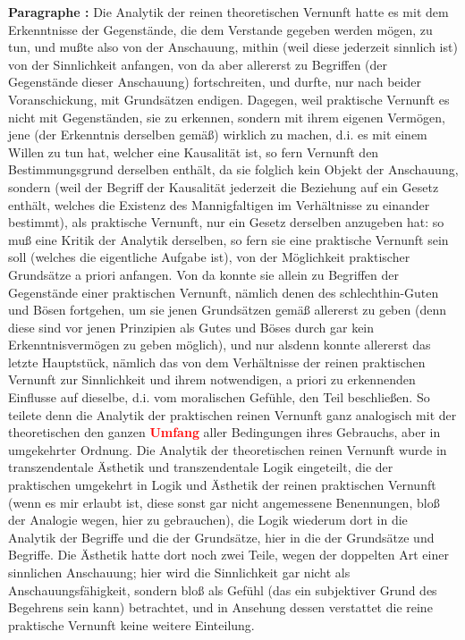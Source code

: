 \documentclass[a4paper,12pt,twoside]{book}
\newcommand{\match}[1]{\textcolor{red}{\textbf{#1}}}
\begin{document}
	\textbf{Paragraphe : }Die Analytik der reinen theoretischen Vernunft hatte es mit dem Erkenntnisse der Gegenstände, die dem Verstande gegeben werden mögen, zu tun, und mußte also von der Anschauung, mithin (weil diese jederzeit sinnlich ist) von der Sinnlichkeit anfangen, von da aber allererst zu Begriffen (der Gegenstände dieser Anschauung) fortschreiten, und durfte, nur nach beider Voranschickung, mit Grundsätzen endigen. Dagegen, weil praktische Vernunft es nicht mit Gegenständen, sie zu erkennen, sondern mit ihrem eigenen Vermögen, jene (der Erkenntnis derselben gemäß) wirklich zu machen, d.i. es mit einem Willen zu tun hat, welcher eine Kausalität ist, so fern Vernunft den Bestimmungsgrund derselben enthält, da sie folglich kein Objekt der Anschauung, sondern (weil der Begriff der Kausalität jederzeit die Beziehung auf ein Gesetz enthält, welches die Existenz des Mannigfaltigen im Verhältnisse zu einander bestimmt), als praktische Vernunft, nur ein Gesetz derselben anzugeben hat: so muß eine Kritik der Analytik derselben, so fern sie eine praktische Vernunft sein soll (welches die eigentliche Aufgabe ist), von der Möglichkeit praktischer Grundsätze a priori anfangen. Von da konnte sie allein zu Begriffen der Gegenstände einer praktischen Vernunft, nämlich denen des schlechthin-Guten und Bösen fortgehen, um sie jenen Grundsätzen gemäß allererst zu geben (denn diese sind vor jenen Prinzipien als Gutes und Böses durch gar kein Erkenntnisvermögen zu geben möglich), und nur alsdenn konnte allererst das letzte Hauptstück, nämlich das von dem Verhältnisse der reinen praktischen Vernunft zur Sinnlichkeit und ihrem notwendigen, a priori zu erkennenden Einflusse auf dieselbe, d.i. vom moralischen Gefühle, den Teil beschließen. So teilete  denn die Analytik der praktischen reinen Vernunft ganz analogisch mit der theoretischen den ganzen \match{Umfang} aller Bedingungen ihres Gebrauchs, aber in umgekehrter Ordnung. Die Analytik der theoretischen reinen Vernunft wurde in transzendentale Ästhetik und transzendentale Logik eingeteilt, die der praktischen umgekehrt in Logik und Ästhetik der reinen praktischen Vernunft (wenn es mir erlaubt ist, diese sonst gar nicht angemessene Benennungen, bloß der Analogie wegen, hier zu gebrauchen), die Logik wiederum dort in die Analytik der Begriffe und die der Grundsätze, hier in die der Grundsätze und Begriffe. Die Ästhetik hatte dort noch zwei Teile, wegen der doppelten Art einer sinnlichen Anschauung; hier wird die Sinnlichkeit gar nicht als Anschauungsfähigkeit, sondern bloß als Gefühl (das ein subjektiver Grund des Begehrens sein kann) betrachtet, und in Ansehung dessen verstattet die reine praktische Vernunft keine weitere Einteilung. 
	
\end{document}
